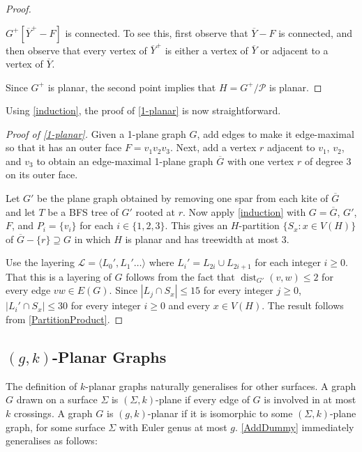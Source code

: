\documentclass{patmorin}
\DeclareMathOperator{\dist}{dist}
\renewcommand{\ge}{\geqslant}
\renewcommand{\le}{\leqslant}
\begin{document}
\begin{proof}
\begin{compactenum}
		\item $G^+[\overline{Y}^+-F]$ is connected. To see this, first observe that $\overline{Y}-F$ is connected, and then observe that every vertex of $\overline{Y}^+$ is either a vertex of $\overline{Y}$ or adjacent to a vertex of $\overline{Y}$.
	\end{compactenum}
	Since $G^+$ is planar, the second point implies that $H=G^+/\mathcal{P}$ is planar.
\end{proof}

Using \cref{induction}, the proof of \cref{1-planar} is now straightforward.

\begin{proof}[Proof of \cref{1-planar}]
	Given a 1-plane graph $G$, add edges to make it edge-maximal so that it has an outer face $F=v_1v_2v_3$. Next, add a vertex $r$ adjacent to $v_1$, $v_2$, and $v_3$ to obtain an edge-maximal 1-plane graph $\overline{G}$ with one vertex $r$ of degree 3 on its outer face.
	
	Let $G'$ be the plane graph obtained by removing one spar from each kite of $\overline{G}$ and let $T$ be a BFS tree of $G'$ rooted at $r$.  Now apply \cref{induction} with $G=\overline{G}$, $G'$, $F$, and $P_i=\{v_i\}$ for each $i\in\{1,2,3\}$.  This gives an $H$-partition $\{S_x:x\in V(H)\}$ of $\overline{G}-\{r\}\supseteq G$ in which $H$ is planar and has treewidth at most 3.
	
	Use the layering $\mathcal{L}=\langle L_0',L_1'\ldots\rangle$ where $L_i'=L_{2i}\cup L_{2i+1}$ for each integer $i\ge 0$. That this is a layering of $G$ follows from the fact that $\dist_{G'}(v,w)\le 2$ for every edge $vw\in E(G)$.  Since $|L_j\cap S_x|\le 15$ for every integer $j\ge 0$, $|L_i'\cap S_x|\le 30$ for every integer $i\ge 0$ and every $x\in V(H)$. The result follows from \cref{PartitionProduct}. 
\end{proof}

\subsection{\boldmath $(g,k)$-Planar Graphs}

The definition of $k$-planar graphs naturally generalises for other surfaces. A graph $G$ drawn on a surface $\Sigma$ is $(\Sigma,k)$-plane if every edge of $G$ is involved in at most $k$ crossings.  A graph $G$ is $(g,k)$-planar if it is isomorphic to some $(\Sigma,k)$-plane graph, for some surface $\Sigma$ with Euler genus at most $g$. \cref{AddDummy} immediately generalises as follows:
\end{document}
